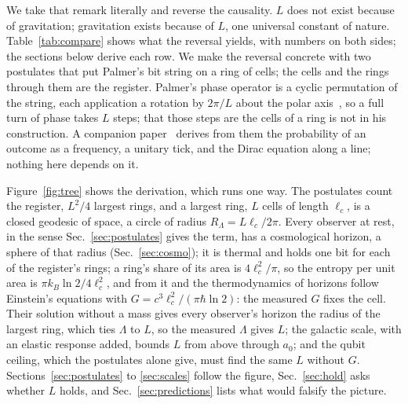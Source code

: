 \documentclass[aps,prd,twocolumn,superscriptaddress,nofootinbib,showkeys]{revtex4-2}
\newcommand{\lc}{\ell_c}
\newcommand{\RL}{R_\Lambda}
\begin{document}
We take that remark literally and reverse the causality. $L$ does not exist because of gravitation; gravitation exists because of $L$, one universal constant of nature. Table~\ref{tab:compare} shows what the reversal yields, with numbers on both sides; the sections below derive each row. We make the reversal concrete with two postulates that put Palmer's bit string on a ring of cells; the cells and the rings through them are the register. Palmer's phase operator is a cyclic permutation of the string, each application a rotation by $2\pi/L$ about the polar axis~\cite{palmer2026}, so a full turn of phase takes $L$ steps; that those steps are the cells of a ring is not in his construction. A companion paper~\cite{korytko2026c} derives from them the probability of an outcome as a frequency, a unitary tick, and the Dirac equation along a line; nothing here depends on it.

Figure~\ref{fig:tree} shows the derivation, which runs one way. The postulates count the register, $L^2/4$ largest rings, and a largest ring, $L$ cells of length $\lc$, is a closed geodesic of space, a circle of radius $\RL = L\lc/2\pi$. Every observer at rest, in the sense Sec.~\ref{sec:postulates} gives the term, has a cosmological horizon, a sphere of that radius (Sec.~\ref{sec:cosmo}); it is thermal and holds one bit for each of the register's rings; a ring's share of its area is $4\lc^2/\pi$, so the entropy per unit area is $\pi k_B\ln2/4\lc^2$, and from it and the thermodynamics of horizons follow Einstein's equations with $G = c^3\lc^2/(\pi\hbar\ln2)$: the measured $G$ fixes the cell. Their solution without a mass gives every observer's horizon the radius of the largest ring, which ties $\Lambda$ to $L$, so the measured $\Lambda$ gives $L$; the galactic scale, with an elastic response added, bounds $L$ from above through $a_0$; and the qubit ceiling, which the postulates alone give, must find the same $L$ without $G$. Sections~\ref{sec:postulates} to \ref{sec:scales} follow the figure, Sec.~\ref{sec:hold} asks whether $L$ holds, and Sec.~\ref{sec:predictions} lists what would falsify the picture.
\end{document}
